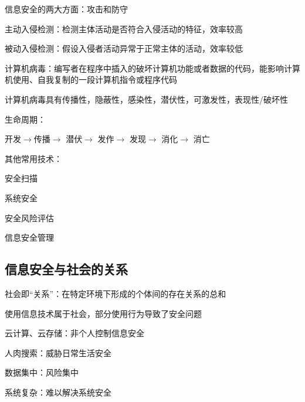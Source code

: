 \begin{notation}
    信息安全的两大方面：攻击和防守
\end{notation}
\begin{notation}
    主动入侵检测：检测主体活动是否符合入侵活动的特征，效率较高

    被动入侵检测：假设入侵者活动异常于正常主体的活动，效率较低
\end{notation}
\begin{defi}
    计算机病毒：编写者在程序中插入的破坏计算机功能或者数据的代码，能影响计算机使用、自我复制的一段计算机指令或程序代码

    计算机病毒具有传播性，隐蔽性，感染性，潜伏性，可激发性，表现性/破坏性

    生命周期：

    开发$\to$传播$\to$ 潜伏$\to$ 发作$\to$ 发现$\to$ 消化$\to$ 消亡
\end{defi}
其他常用技术：

安全扫描

系统安全

安全风险评估

信息安全管理
\subsection{信息安全与社会的关系}%
\label{sub:信息安全与社会的关系}
\begin{defi}
    社会即“关系”：在特定环境下形成的个体间的存在关系的总和
\end{defi}
使用信息技术属于社会，部分使用行为导致了安全问题
\begin{eg}
    云计算、云存储：非个人控制信息安全

    人肉搜索：威胁日常生活安全

    数据集中：风险集中

    系统复杂：难以解决系统安全
\end{eg}

